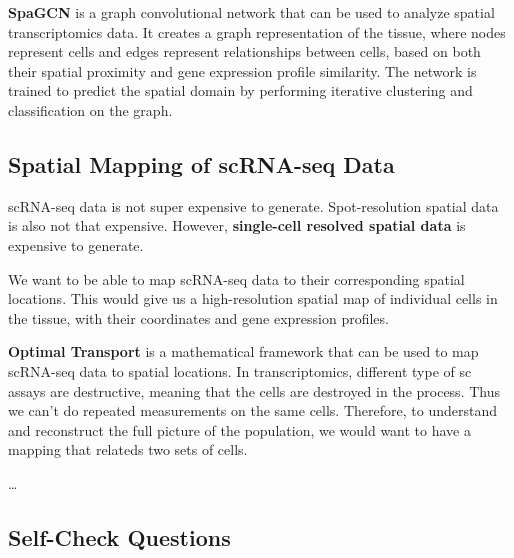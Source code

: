 \documentclass[a4paper]{article}
\begin{document}
\textbf{SpaGCN} is a graph convolutional network that can be used to
analyze spatial transcriptomics data. It creates a graph representation
of the tissue, where nodes represent cells and edges represent relationships
between cells, based on both their spatial proximity and gene expression
profile similarity. The network is trained to predict the spatial domain
by performing iterative clustering and classification on the graph.

\subsection*{Spatial Mapping of scRNA-seq Data}

scRNA-seq data is not super expensive to generate. Spot-resolution
spatial data is also not that expensive. However, \textbf{single-cell resolved
spatial data} is expensive to generate.

We want to be able to map scRNA-seq data to their corresponding spatial locations. 
This would give us a high-resolution spatial map of individual cells in the tissue,
with their coordinates and gene expression profiles. 

\textbf{Optimal Transport} is a mathematical framework that can be used to
map scRNA-seq data to spatial locations. In transcriptomics, different type
of sc assays are destructive, meaning that the cells are destroyed in the
process. Thus we can't do repeated measurements on the same cells.
Therefore, to understand and reconstruct the full picture of the population, 
we would want to have a mapping that relateds two sets of cells.

\dots

\subsection*{Self-Check Questions}
\end{document}
